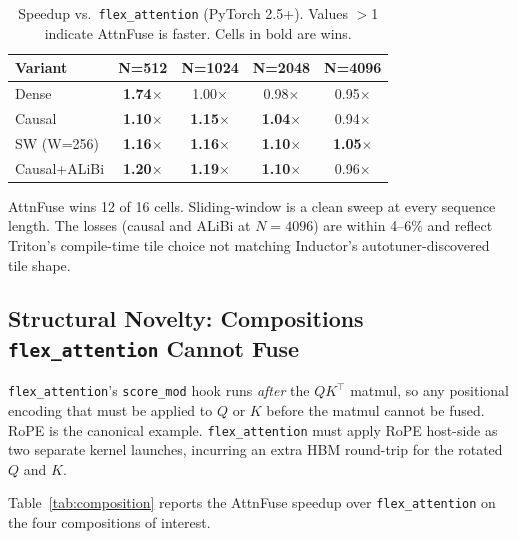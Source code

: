 \documentclass[10pt,twocolumn]{article}
\begin{document}
\begin{table}[H]
\centering
\caption{Speedup vs.\ \texttt{flex\_attention} (PyTorch 2.5+).
Values $>$1 indicate AttnFuse is faster. Cells in bold are wins.}
\label{tab:flex_headtohead}
\small
\begin{tabular}{lcccc}
\toprule
\textbf{Variant} & \textbf{N=512} & \textbf{N=1024} & \textbf{N=2048} & \textbf{N=4096} \\
\midrule
Dense        & \textbf{1.74}$\times$ & 1.00$\times$ & 0.98$\times$ & 0.95$\times$ \\
Causal       & \textbf{1.10}$\times$ & \textbf{1.15}$\times$ & \textbf{1.04}$\times$ & 0.94$\times$ \\
SW (W=256)   & \textbf{1.16}$\times$ & \textbf{1.16}$\times$ & \textbf{1.10}$\times$ & \textbf{1.05}$\times$ \\
Causal+ALiBi & \textbf{1.20}$\times$ & \textbf{1.19}$\times$ & \textbf{1.10}$\times$ & 0.96$\times$ \\
\bottomrule
\end{tabular}
\end{table}

AttnFuse wins 12 of 16 cells. Sliding-window is a clean sweep at every
sequence length. The losses (causal and ALiBi at $N{=}4096$) are within
4--6\% and reflect Triton's compile-time tile choice not matching
Inductor's autotuner-discovered tile shape.

\subsection{Structural Novelty: Compositions \texttt{flex\_attention} Cannot Fuse}
\label{sec:composition}

\texttt{flex\_attention}'s \texttt{score\_mod} hook runs \emph{after} the
$QK^\top$ matmul, so any positional encoding that must be applied to
$Q$ or $K$ before the matmul cannot be fused. RoPE is the canonical
example. \texttt{flex\_attention} must apply RoPE host-side as two
separate kernel launches, incurring an extra HBM round-trip for the
rotated $Q$ and $K$.

Table~\ref{tab:composition} reports the AttnFuse speedup over
\texttt{flex\_attention} on the four compositions of interest.
\end{document}
